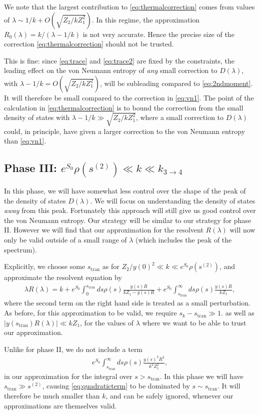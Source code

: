 \documentclass[11pt]{article}
\newcommand{\stran}{s_{\text{tran}}}
\newcommand{\smax}{s_k}
\numberwithin{equation}{section}
\begin{document}
We note that the largest contribution to \eqref{eq:thermalcorrection} comes from values of $\lambda \sim 1/k + O(\sqrt{Z_2 / k Z_1^2})$. In this regime, the approximation $R_0 (\lambda) = k/(\lambda - 1/k)$ is not very accurate. Hence the precise size of the correction \eqref{eq:thermalcorrection} should not be trusted. 

This is fine: since \eqref{eq:trace} and \eqref{eq:trace2} are fixed by the constraints, the leading effect on the von Neumann entropy of \emph{any} small correction to $D(\lambda)$, with $\lambda - 1/k = O(\sqrt{Z_2 / k Z_1^2})$, will be subleading compared to \eqref{eq:2ndmoment}. It will therefore be small compared to the correction in \eqref{eq:vn1}. The point of the calculation in \eqref{eq:thermalcorrection} is to bound the correction from the small density of states with $\lambda - 1/k  \gg \sqrt{Z_2 / k Z_1^2}$, where a small correction to $D(\lambda)$ could, in principle, have given a larger correction to the von Neumann entropy than \eqref{eq:vn1}.

\subsection*{Phase III: $e^{S_0} \rho( s^{(2)}) \ll k \ll k_{3 \to 4}$}
In this phase, we will have somewhat less control over the shape of the peak of the density of states $D(\lambda)$. We will focus on understanding the density of states \emph{away} from this peak. Fortunately this approach will still give us good control over the von Neumann entropy. Our strategy will be similar to our strategy for phase II. However we will find that our approximation for the resolvent $R(\lambda)$ will now only be valid outside of a small range of $\lambda$ (which includes the peak of the spectrum). 

Explicitly, we choose some $\stran$ as for $Z_2/y(0)^2 \ll k \ll e^{S_0} \rho( s^{(2)})$, and approximate the resolvent equation by
\begin{align}
\lambda R(\lambda) = k  + e^{S_0}\int_0^{\stran} ds \rho(s) \frac{y(s) R}{k Z_1 - y(s) R} +  e^{S_0}\int_{\stran}^\infty ds \rho(s) \frac{y(s) R}{k Z_1} ,
\end{align}
where the second term on the right hand side is treated as a small perturbation. As before, for this approximation to be valid, we require $\smax - \stran \gg 1$. as well as $|y(\stran) R(\lambda)| \ll k Z_1$, for the values of $\lambda$ where we want to be able to trust our approximation.

Unlike for phase II, we do not include a term
\begin{align} \label{eq:quadraticterm}
e^{S_0}\int_{\stran}^\infty ds \rho(s) \frac{y(s)^2 R^2}{k^2 Z_1^2},
\end{align}
in our approximation for the integral over $s > \stran$. In this phase we will have $\stran \gg s^{(2)}$, causing \eqref{eq:quadraticterm} to be dominated by $s \sim \stran$. It will therefore be much smaller than $k$, and can be safely ignored, whenever our approximations are themselves valid.
\end{document}

